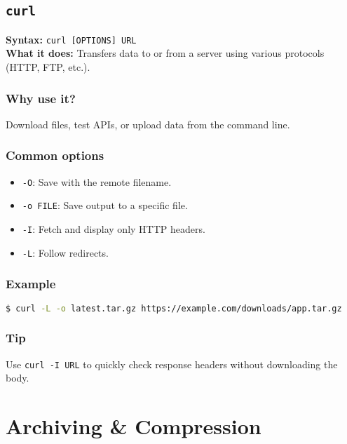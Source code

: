 \documentclass[10pt,oneside]{scrbook}
\begin{document}
\section{\texttt{curl}}
\begin{cmdbox}
  \textbf{Syntax:} \lstinline!curl [OPTIONS] URL! \\
  \textbf{What it does:} Transfers data to or from a server using various protocols (HTTP, FTP, etc.).
\end{cmdbox}
\begin{commanddetails}
  \subsection*{Why use it?}
    Download files, test APIs, or upload data from the command line.

  \subsection*{Common options}
    \begin{itemize}
      \item \lstinline!-O!: Save with the remote filename.
      \item \lstinline!-o FILE!: Save output to a specific file.
      \item \lstinline!-I!: Fetch and display only HTTP headers.
      \item \lstinline!-L!: Follow redirects.
    \end{itemize}

  \subsection*{Example}
  \begin{lstlisting}[language=bash]
$ curl -L -o latest.tar.gz https://example.com/downloads/app.tar.gz
  \end{lstlisting}

  \subsection*{Tip}
    Use \lstinline!curl -I URL! to quickly check response headers without downloading the body.
\end{commanddetails}

\chapter{Archiving \& Compression}
\end{document}
